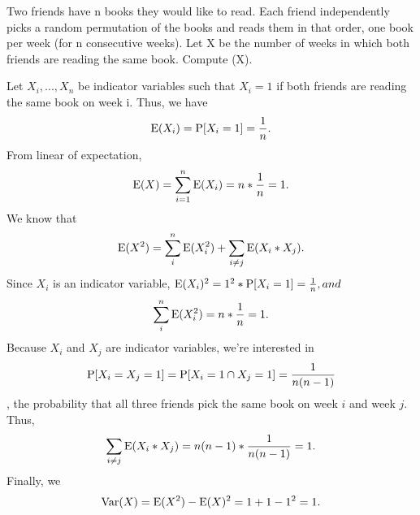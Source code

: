 \question Two friends have n books they would like to read. Each friend independently picks a random permutation of the books and reads them in that order, one book per week (for n consecutive weeks). Let X be the number of weeks in which both friends are reading the same book. Compute \var(X).
\begin{solution}[2cm]
Let $X_i,...,X_n$ be indicator variables such that $X_i = 1$ if both friends are reading the same book on week i. Thus, we have
\[\E(X_i) = \P[X_i = 1] = \frac{1}{n}.\]
From linear of expectation,
\[\E(X) = \sum_{i= 1}^{n} \E(X_i) = n*\frac{1}{n} = 1.\]
We know that 
\[\E(X^2) = \sum_{i}^{n} \E(X_i^2) + \sum_{i \neq j} \E(X_i*X_j).\]
Since $X_i$ is an indicator variable, $\E(X_i)^2 = 1^2*\P[X_i= 1] = \frac{1}{n}, and$ 
\[\sum_{i}^{n} \E(X_i^2) = n*\frac{1}{n} = 1. \]
Because $X_i$ and $X_j$ are indicator variables, we're interested in 
\[\P[X_i = X_j = 1] = \P[X_i = 1 \cap X_j = 1] = \frac{1}{n(n-1)}\], 
the probability that all three friends pick the same book on week $i$ and week $j$. Thus, 
\[\sum_{i \neq j} \E(X_i*X_j) = n(n-1)*\frac{1}{n(n-1)} = 1.\]
Finally, we 
\[\var(X) = \E(X^2) - \E(X)^2 = 1 + 1 - 1^2 = 1.\]
\end{solution}

